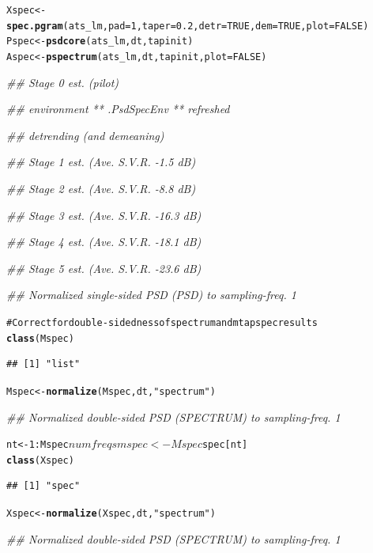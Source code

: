\documentclass{article}\usepackage{graphicx, color}
\makeatletter
\newcommand{\hlfunctioncall}[1]{\textcolor[rgb]{0.501960784313725,0,0.329411764705882}{\textbf{#1}}}%
\newcommand{\hlstring}[1]{\textcolor[rgb]{0.6,0.6,1}{#1}}%
\newcommand{\hlcomment}[1]{\textcolor[rgb]{0.180392156862745,0.6,0.341176470588235}{#1}}%
\newenvironment{kframe}{%
 \def\at@end@of@kframe{}%
 \ifinner\ifhmode%
  \def\at@end@of@kframe{\end{minipage}}%
  \begin{minipage}{\columnwidth}%
 \fi\fi%
 \def\FrameCommand##1{\hskip\@totalleftmargin \hskip-\fboxsep
 \colorbox{shadecolor}{##1}\hskip-\fboxsep
     \hskip-\linewidth \hskip-\@totalleftmargin \hskip\columnwidth}%
 \MakeFramed {\advance\hsize-\width
   \@totalleftmargin\z@ \linewidth\hsize
   \@setminipage}}%
 {\par\unskip\endMakeFramed%
 \at@end@of@kframe}
\newenvironment{knitrout}{}{} %
\makeatother
\begin{document}
\begin{knitrout}
\color{fgcolor}\begin{kframe}
\begin{alltt}
Xspec <- \hlfunctioncall{spec.pgram}(ats_lm, pad = 1, taper = 0.2, detr = TRUE, dem = TRUE, plot = FALSE)
Pspec <- \hlfunctioncall{psdcore}(ats_lm, dt, tapinit)
Aspec <- \hlfunctioncall{pspectrum}(ats_lm, dt, tapinit, plot = FALSE)
\end{alltt}


{\ttfamily\noindent\itshape\textcolor{messagecolor}{\#\# Stage  0 est. (pilot)}}

{\ttfamily\noindent\itshape\textcolor{messagecolor}{\#\# 	environment  ** .PsdSpecEnv **  refreshed}}

{\ttfamily\noindent\itshape\textcolor{messagecolor}{\#\# detrending (and demeaning)}}

{\ttfamily\noindent\itshape\textcolor{messagecolor}{\#\# Stage  1 est. (Ave. S.V.R. -1.5 dB)}}

{\ttfamily\noindent\itshape\textcolor{messagecolor}{\#\# Stage  2 est. (Ave. S.V.R. -8.8 dB)}}

{\ttfamily\noindent\itshape\textcolor{messagecolor}{\#\# Stage  3 est. (Ave. S.V.R. -16.3 dB)}}

{\ttfamily\noindent\itshape\textcolor{messagecolor}{\#\# Stage  4 est. (Ave. S.V.R. -18.1 dB)}}

{\ttfamily\noindent\itshape\textcolor{messagecolor}{\#\# Stage  5 est. (Ave. S.V.R. -23.6 dB)}}

{\ttfamily\noindent\itshape\textcolor{messagecolor}{\#\# Normalized  single-sided PSD  (PSD)  to sampling-freq.  1}}\begin{alltt}
\hlcomment{# Correct for double-sidedness of spectrum and mtapspec results}
\hlfunctioncall{class}(Mspec)
\end{alltt}
\begin{verbatim}
## [1] "list"
\end{verbatim}
\begin{alltt}
Mspec <- \hlfunctioncall{normalize}(Mspec, dt, \hlstring{"spectrum"})
\end{alltt}


{\ttfamily\noindent\itshape\textcolor{messagecolor}{\#\# Normalized  double-sided PSD  (SPECTRUM)  to sampling-freq.  1}}\begin{alltt}
nt <- 1:Mspec$numfreqs
mspec <- Mspec$spec[nt]
\hlfunctioncall{class}(Xspec)
\end{alltt}
\begin{verbatim}
## [1] "spec"
\end{verbatim}
\begin{alltt}
Xspec <- \hlfunctioncall{normalize}(Xspec, dt, \hlstring{"spectrum"})
\end{alltt}


{\ttfamily\noindent\itshape\textcolor{messagecolor}{\#\# Normalized  double-sided PSD  (SPECTRUM)  to sampling-freq.  1}}\end{kframe}
\end{knitrout}
\end{document}
